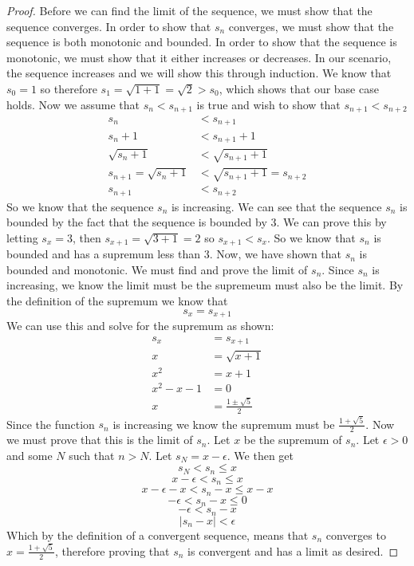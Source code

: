 \begin{proof}
Before we can find the limit of the sequence, we must show that the sequence converges. In order to show that $s_n$ converges, we must show that the sequence is both monotonic and bounded. In order to show that the sequence is monotonic, we must show that it either increases or decreases. In our scenario, the sequence increases and we will show this through induction. We know that $s_0 = 1$ so therefore $s_1 = \sqrt{1 + 1} = \sqrt{2} > s_0$, which shows that our base case holds. Now we assume that $s_n < s_{n+1}$ is true and wish to show that $s_{n+1} < s_{n+2}$
\begin{align*}
    s_n & < s_{n+1} \\
    s_n  + 1& < s_{n+1} + 1\\
    \sqrt{s_n  + 1}& < \sqrt{s_{n+1} + 1}\\
    s_{n+1}= \sqrt{s_n  + 1}& < \sqrt{s_{n+1} + 1} = s_{n+2}\\
    s_{n+1}& < s_{n+2}
\end{align*}
So we know that the sequence $s_n$ is increasing. We can see that the sequence $s_n$ is bounded by the fact that the sequence is bounded by 3. We can prove this by letting $s_x = 3$, then $s_{x+1} = \sqrt{3 + 1} = 2$ so $s_{x+1} < s_x$.
So we know that $s_n$ is bounded and has a supremum less than 3.
Now, we have shown that $s_n$ is bounded and monotonic. We must find and prove the limit of $s_n$. Since $s_n$ is increasing, we know the limit must be the supremeum must also be the limit.
By the definition of the supremum we know that $$s_x = s_{x+1}$$
We can use this and solve for the supremum as shown:
\begin{align*}
    s_x &= s_{x+1} \\
    x &= \sqrt{x + 1} \\
    x^2 &= x + 1 \\
    x^2 - x -1 & = 0\\
    x & = \frac{1 \pm \sqrt{5}}{2}
\end{align*}
Since the function $s_n$ is increasing we know the supremum must be $\frac{1 + \sqrt{5}}{2}$. Now we must prove that this is the limit of $s_n$. Let $x$ be the supremum of $s_n$. Let $\epsilon > 0$ and some $N$ such that $n>N$. Let $s_N = x - \epsilon$. We then get
$$s_N < s_n \leq x $$
$$ x - \epsilon < s_n \leq x $$
$$ x - \epsilon -x  < s_n - x \leq x - x $$
$$ - \epsilon  < s_n - x \leq 0$$
$$ - \epsilon  < s_n - x$$
$$|s_n - x| < \epsilon$$
Which by the definition of a convergent sequence, means that $s_n$ converges to $x = \frac{1 + \sqrt{5}}{2}$, therefore proving that $s_n$ is convergent and has a limit as desired.
\end{proof}

